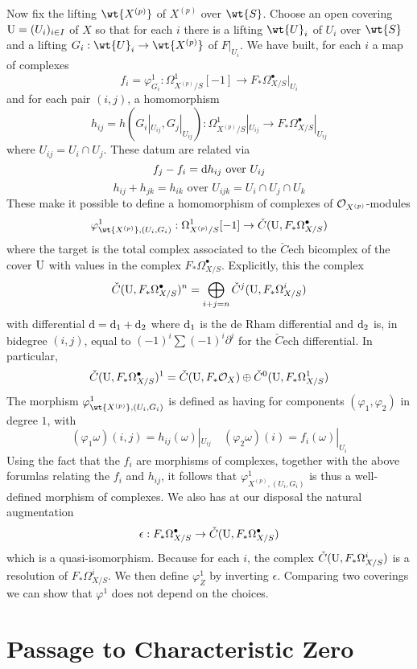 \documentclass[12pt]{article}
\begin{document}
Now fix the lifting $\wt{X^{(p)}}$ of $X^{(p)}$ over $\wt{S}$. Choose an open covering $\mathrm{U} = (U_i)_{i \in I}$ of $X$ so that for each $i$ there is a lifting $\wt{U}_i$ of $U_i$ over $\wt{S}$ and a lifting $G_i : \wt{U}_i \to \wt{X^{(p)}}$ of $F|_{U_i}$. We have built, for each $i$ a map of complexes
\[ f_i = \varphi^1_{G_i} : \Omega^1_{X^{(p)}/S}[-1] \to F_* \Omega_{X/S}^\bullet|_{U_i} \]
and for each pair $(i,j)$, a homomorphism
\[ h_{ij} = h(G_i|_{U_{ij}}, G_j|_{U_{ij}}) : \Omega^1_{X^{(p)}/S}|_{U_{ij}} \to F_* \Omega^\bullet_{X/S}|_{U_{ij}} \]
where $U_{ij} = U_i \cap U_j$. These datum are related via
\[ f_j - f_i = \mathrm{d}{h_{ij}} \text{ over } U_{ij} \]
\[ h_{ij} + h_{jk} = h_{ik} \text{ over } U_{ijk} = U_i \cap U_j \cap U_k \]
These make it possible to define a homomorphism of complexes of $\mathcal{O}_{X^{(p)}}$-modules
\[ \varphi^1_{\wt{X^{(p)}}, (U_i, G_i)} : \Omega^1_{X^{(p)}/S}[-1] \to \check{C}(\U, F_* \Omega^\bullet_{X/S}) \]
where the target is the total complex associated to the $\check{C}$ech bicomplex of the cover $\mathrm{U}$ with values in the complex $F_* \Omega^\bullet_{X/S}$. Explicitly, this the complex
\[ \check{C}(\mathrm{U}, F_* \Omega_{X/S}^\bullet)^n = \bigoplus_{i+j = n} \check{C}^j(\mathrm{U}, F_* \Omega_{X/S}^i) \]
with differential $\mathrm{d} = \mathrm{d}_1 + \mathrm{d}_2$ where $\mathrm{d}_1$ is the de Rham differential and $\mathrm{d}_2$ is, in bidegree $(i,j)$, equal to $(-1)^i \sum (-1)^i \partial^i$ for the $\check{C}$ech differential. In particular,
\[ \check{C}(\mathrm{U}, F_* \Omega^\bullet_{X/S})^1 = \check{C}(\mathrm{U}, F_* \mathcal{O}_{X}) \oplus \check{C}^0(\mathrm{U}, F_* \Omega_{X/S}^1) \]
The morphism $\varphi^1_{\wt{X^{(p)}}, (U_i, G_i)}$ is defined as having for components $(\varphi_1, \varphi_2)$ in degree $1$, with
\[ (\varphi_1 \omega)(i,j) = h_{ij}(\omega)|_{U_{ij}} \quad (\varphi_2 \omega)(i) = f_i(\omega)|_{U_i} \]
Using the fact that the $f_i$ are morphisms of complexes, together with the above forumlas relating the $f_i$ and $h_{ij}$, it follows that $\varphi^1_{X^{(p)}, (U_i, G_i)}$ is thus a well-defined morphism of complexes. We also has at our disposal the natural augmentation
\[ \epsilon : F_* \Omega_{X/S}^\bullet \to \check{C}(\mathrm{U}, F_* \Omega_{X/S}^\bullet) \]
which is a quasi-isomorphism. Because for each $i$, the complex $\check{C}(\mathrm{U}, F_* \Omega_{X/S}^i)$ is a resolution of $F_* \Omega_{X/S}^i$. We then define $\varphi^1_Z$ by inverting $\epsilon$. Comparing two coverings we can show that $\varphi^1$ does not depend on the choices. 

\section{Passage to Characteristic Zero}
\end{document}

